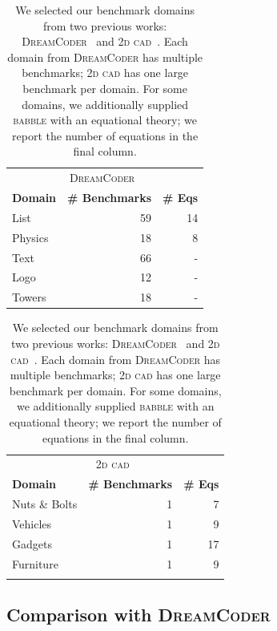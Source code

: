 \documentclass[acmsmall,screen,nonacm,review=false,timestamp=false]{acmart}
\newcommand{\tname}[1]{\textsc{#1}\xspace}
\newcommand{\tool}{\tname{babble}}
\newcommand{\dc}{\tname{DreamCoder}}
\newcommand{\cogsci}{\tname{2d cad}}
\begin{document}
\begin{table}
  \centering
  \begin{tabular}{lrr}
    \multicolumn{3}{c}{\dc~\cite{dreamcoder}} \\
    \bf Domain & \bf \# Benchmarks & \bf \# Eqs \\
    List    & 59 & 14 \\
    Physics & 18 & 8 \\
    Text    & 66 & - \\
    Logo    & 12 & - \\
    Towers  & 18 & -
  \end{tabular}\qquad \begin{tabular}{lrr}
    \multicolumn{3}{c}{\cogsci~\cite{cogsci-dataset}} \\
    \bf Domain & \bf \# Benchmarks & \bf \# Eqs \\
    Nuts \& Bolts & 1 & 7 \\
    Vehicles      & 1 & 9 \\
    Gadgets       & 1 & 17 \\
    Furniture     & 1 & 9 \\
    & \end{tabular}
  \caption{
    We selected our benchmark domains from two previous works:
     \dc~\cite{dreamcoder}
     and \cogsci~\cite{cogsci-dataset}.
    Each domain from \dc has multiple benchmarks;
     \cogsci has one large benchmark per domain.
    For some domains,
     we additionally supplied \tool with an equational theory;
     we report the number of equations in the final column.
  }\label{tab:benchmarks}
\end{table}

\subsection{Comparison with \dc}
\end{document}

